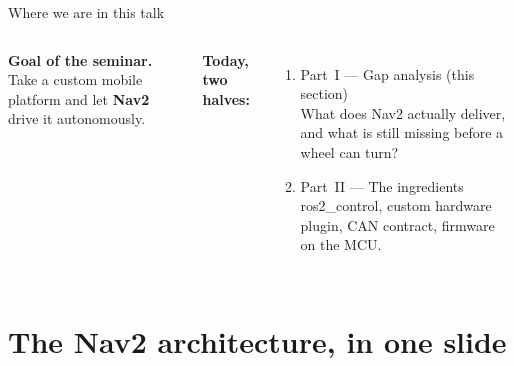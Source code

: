 \begin{frame}{Where we are in this talk}
  \begin{columns}[T,onlytextwidth]
      \textbf{Goal of the seminar.}\\
      Take a custom mobile platform and let \textbf{Nav2} drive it autonomously.
      \vspace{1.0em}

      \textbf{Today, two halves:}
      \begin{enumerate}
        \item \alert{Part~I — Gap analysis} \hfill (this section)\\
              \footnotesize\textcolor{black!60}{What does Nav2 actually deliver,
              and what is still missing before a wheel can turn?}
        \item Part~II — The ingredients\\
              \footnotesize\textcolor{black!60}{ros2\_control, custom hardware
              plugin, CAN contract, firmware on the MCU.}
      \end{enumerate}

  \end{columns}
\end{frame}

\section{The Nav2 architecture, in one slide}

